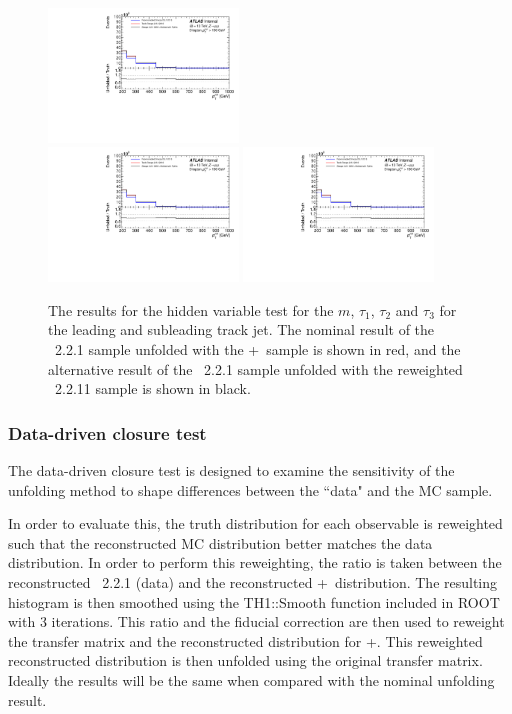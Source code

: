 \begin{figure}[h!]
  \includegraphics[page=654,width=0.45\textwidth]{figures/IBUClosureTests.pdf} \\
  \includegraphics[page=618,width=0.45\textwidth]{figures/IBUClosureTests.pdf}
  \includegraphics[page=660,width=0.45\textwidth]{figures/IBUClosureTests.pdf}
  \caption{The results for the hidden variable test for the $m$, $\tau_1$, $\tau_2$ and $\tau_3$ for the leading and subleading track jet. The nominal result of the \sherpa~2.2.1 sample unfolded with the \powheg+\pythia~sample is shown in red, and the alternative result of the \sherpa~2.2.1 sample unfolded with the reweighted \sherpa~2.2.11 sample is shown in black.}
  \label{fig:HVTestTJ2}
\end{figure}

\subsubsection{Data-driven closure test}
The data-driven closure test is designed to examine the sensitivity of the unfolding method to shape differences between the ``data" and the MC sample.

In order to evaluate this, the truth distribution for each observable is reweighted such that the reconstructed MC distribution better matches the data distribution.
In order to perform this reweighting, the ratio is taken between the reconstructed \sherpa~2.2.1 (data) and the reconstructed \powheg+\pythia~distribution. The resulting histogram is then smoothed using the TH1::Smooth function included in ROOT with 3 iterations. This ratio and the fiducial correction are
then used to reweight the transfer matrix and the reconstructed distribution for \powheg+\pythia. This reweighted reconstructed distribution is then unfolded using the original transfer matrix. Ideally the results will be the same when compared with the nominal unfolding result.

